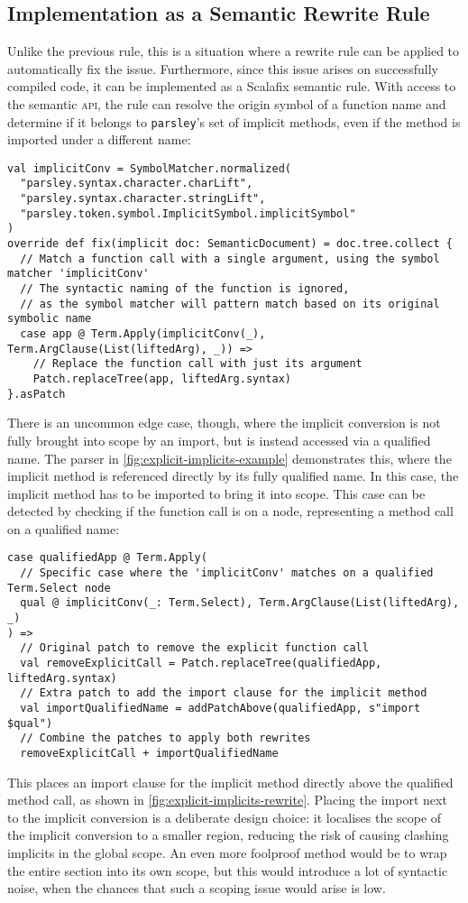 \documentclass[../../main.tex]{subfiles}
\begin{document}
\subsection{Implementation as a Semantic Rewrite Rule}
Unlike the previous rule, this is a situation where a rewrite rule can be applied to automatically fix the issue.
Furthermore, since this issue arises on successfully compiled code, it can be implemented as a Scalafix semantic rule.
With access to the semantic \textsc{api}, the rule can resolve the origin symbol of a function name and determine if it belongs to \texttt{parsley}'s set of implicit methods, even if the method is imported under a different name:
\begin{verbatim}
val implicitConv = SymbolMatcher.normalized(
  "parsley.syntax.character.charLift",
  "parsley.syntax.character.stringLift",
  "parsley.token.symbol.ImplicitSymbol.implicitSymbol"
)
override def fix(implicit doc: SemanticDocument) = doc.tree.collect {
  // Match a function call with a single argument, using the symbol matcher 'implicitConv'
  // The syntactic naming of the function is ignored,
  // as the symbol matcher will pattern match based on its original symbolic name
  case app @ Term.Apply(implicitConv(_), Term.ArgClause(List(liftedArg), _)) =>
    // Replace the function call with just its argument
    Patch.replaceTree(app, liftedArg.syntax)
}.asPatch
\end{verbatim}
%
There is an uncommon edge case, though, where the implicit conversion is not fully brought into scope by an import, but is instead accessed via a qualified name.
The  parser in \cref{fig:explicit-implicits-example} demonstrates this, where the  implicit method is referenced directly by its fully qualified name.
In this case, the implicit method has to be imported to bring it into scope.
This case can be detected by checking if the function call is on a  node, representing a method call on a qualified name:
\begin{verbatim}
case qualifiedApp @ Term.Apply(
  // Specific case where the 'implicitConv' matches on a qualified Term.Select node
  qual @ implicitConv(_: Term.Select), Term.ArgClause(List(liftedArg), _)
) =>
  // Original patch to remove the explicit function call
  val removeExplicitCall = Patch.replaceTree(qualifiedApp, liftedArg.syntax)
  // Extra patch to add the import clause for the implicit method
  val importQualifiedName = addPatchAbove(qualifiedApp, s"import $qual")
  // Combine the patches to apply both rewrites
  removeExplicitCall + importQualifiedName
\end{verbatim}
%
This places an import clause for the implicit method directly above the qualified method call, as shown in \cref{fig:explicit-implicits-rewrite}.
Placing the import next to the implicit conversion is a deliberate design choice: it localises the scope of the implicit conversion to a smaller region, reducing the risk of causing clashing implicits in the global scope.
An even more foolproof method would be to wrap the entire section into its own scope, but this would introduce a lot of syntactic noise, when the chances that such a scoping issue would arise is low.
\end{document}
